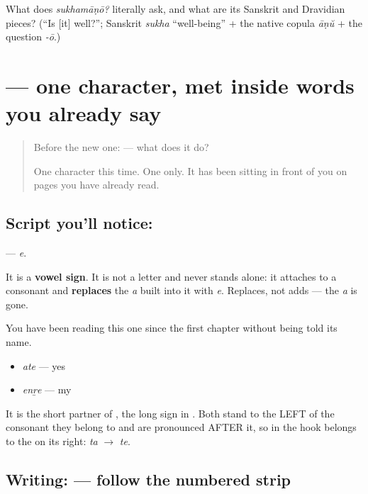 \begin{tcolorbox}[breakable,colback=teal!4,colframe=teal!35!black,title={Before you move on}]
What does \emph{sukhamāṇō?} literally ask, and what are its Sanskrit and Dravidian pieces? (\textquotedblleft{}Is {[}it{]} well?\textquotedblright{}; Sanskrit \emph{sukha} \textquotedblleft{}well-being\textquotedblright{} + the native copula \emph{āṇŭ} + the question \emph{-ō}.)
\end{tcolorbox}
\section[\texorpdfstring{\ml{െ} (e)}{െ (e)}]{ — one character, met inside words you already say}

\label{lesson:ML-S139-vowel-sign-e}



\begin{quote}
Before the new one:  — what does it do?

One character this time. One only. It has been sitting in front of you on pages you have already read.
\end{quote}

\subsection*{Script you'll notice: }
\textbf{} — \emph{e}.

It is a \textbf{vowel sign}. It is not a letter and never stands alone: it attaches to a consonant and \textbf{replaces} the \emph{a} built into it with \emph{e}. Replaces, not adds — the \emph{a} is gone.

You have been reading this one since the first chapter without being told its name.

\begin{itemize}
\raggedright
  \item \textbf{} \emph{ate} — yes
  \item \textbf{} \emph{enṟe} — my
\end{itemize}

It is the short partner of \textbf{}, the long sign in \textbf{}. Both stand to the LEFT of the consonant they belong to and are pronounced AFTER it, so in \textbf{} the hook belongs to the \textbf{} on its right: \emph{ta} $\to$ \emph{te}.

\subsection*{Writing:  — follow the numbered strip}

